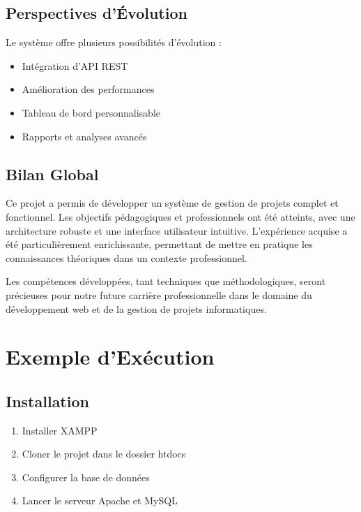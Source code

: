 \documentclass[12pt,a4paper]{article}
\begin{document}
\subsection{Perspectives d'Évolution}
Le système offre plusieurs possibilités d'évolution :
\begin{itemize}
    \item Intégration d'API REST
    \item Amélioration des performances
    \item Tableau de bord personnalisable
    \item Rapports et analyses avancés
\end{itemize}

\subsection{Bilan Global}
Ce projet a permis de développer un système de gestion de projets complet et fonctionnel. Les objectifs pédagogiques et professionnels ont été atteints, avec une architecture robuste et une interface utilisateur intuitive. L'expérience acquise a été particulièrement enrichissante, permettant de mettre en pratique les connaissances théoriques dans un contexte professionnel.

Les compétences développées, tant techniques que méthodologiques, seront précieuses pour notre future carrière professionnelle dans le domaine du développement web et de la gestion de projets informatiques.

\section{Exemple d'Exécution}
\subsection{Installation}
\begin{enumerate}
    \item Installer XAMPP
    \item Cloner le projet dans le dossier htdocs
    \item Configurer la base de données
    \item Lancer le serveur Apache et MySQL
\end{enumerate}
\end{document}

